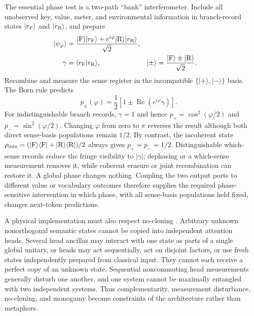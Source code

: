 \documentclass[
  aps,
  reprint,
  superscriptaddress,
  floatfix,
  nofootinbib,
  longbibliography
]{revtex4-2}
\begin{document}
The essential phase test is a two-path ``bank'' interferometer.  Include all
unobserved key, value, meter, and environmental information in branch-record
states $|r_{\rm F}\rangle$ and $|r_{\rm R}\rangle$, and prepare
\begin{equation}
\begin{aligned}
 |\psi_\varphi\rangle
 &=\frac{|{\rm F}\rangle|r_{\rm F}\rangle
 +e^{i\varphi}|{\rm R}\rangle|r_{\rm R}\rangle}{\sqrt{2}},\\
 \gamma&=\langle r_{\rm F}|r_{\rm R}\rangle,
 &|\mathord{\pm}\rangle
 &=\frac{|{\rm F}\rangle\pm|{\rm R}\rangle}{\sqrt{2}} .
\end{aligned}
\label{eq:eqia-bank-state}
\end{equation}
Recombine and measure the sense register in the incompatible
$\{|\mathord{+}\rangle,|\mathord{-}\rangle\}$ basis.  The Born rule predicts
\begin{equation}
 p_\pm(\varphi)
 =\frac12\left[1\pm
 \operatorname{Re}\!\left(e^{i\varphi}\gamma\right)\right].
\label{eq:eqia-bank-fringe}
\end{equation}
For indistinguishable branch records, $\gamma=1$ and hence
$p_+=\cos^2(\varphi/2)$ and $p_-=\sin^2(\varphi/2)$.  Changing $\varphi$
from zero to $\pi$ reverses the result although both direct sense-basis
populations remain $1/2$.  By contrast, the incoherent state
$\rho_{\rm mix}=(|{\rm F}\rangle\langle{\rm F}|
+|{\rm R}\rangle\langle{\rm R}|)/2$ always gives $p_+=p_-=1/2$.
Distinguishable which-sense records reduce the fringe visibility to
$|\gamma|$; dephasing or a which-sense measurement removes it, while coherent
erasure or joint recombination can restore it.  A global phase changes
nothing.  Coupling the two output ports to different value or vocabulary
outcomes therefore supplies the required phase-sensitive intervention in which
phase, with all sense-basis populations held fixed, changes next-token
predictions.

A physical implementation must also respect no-cloning
\cite{wo-zu,nielsen-book10}.  Arbitrary unknown nonorthogonal semantic states
cannot be copied into independent attention heads.  Several head ancillas may
interact with one state as parts of a single global unitary, or heads may act
sequentially, act on disjoint factors, or use fresh states independently
prepared from classical input.  They cannot each receive a perfect copy of an
unknown state.  Sequential noncommuting head measurements generally disturb
one another, and one system cannot be maximally entangled with two independent
systems.  Thus complementarity, measurement disturbance, no-cloning, and
monogamy become constraints of the architecture rather than metaphors.
\end{document}
